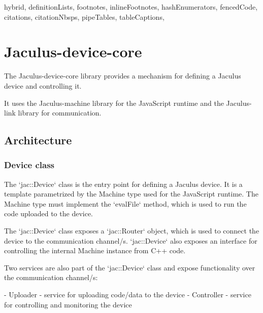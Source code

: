 \begin{markdown*}{%
  hybrid,
  definitionLists,
  footnotes,
  inlineFootnotes,
  hashEnumerators,
  fencedCode,
  citations,
  citationNbsps,
  pipeTables,
  tableCaptions,
}

\chapter{Jaculus-device-core}

The Jaculus-device-core library provides a mechanism for defining a Jaculus device and controlling it.

It uses the Jaculus-machine library for the JavaScript runtime and the Jaculus-link library for communication.



\section{Architecture}

\subsection{Device class}

The `jac::Device` class is the entry point for defining a Jaculus device. It is a template parametrized by the Machine type used for the JavaScript runtime. The Machine type must implement the `evalFile` method, which is used to run the code uploaded to the device.

The `jac::Device` class exposes a `jac::Router` object, which is used to connect the device to the communication channel/s. `jac::Device` also exposes an interface for controlling the internal Machine instance from C++ code.

Two services are also part of the `jac::Device` class and expose functionality over the communication channel/s:

  - Uploader - service for uploading code/data to the device
  - Controller - service for controlling and monitoring the device


\end{markdown*}
